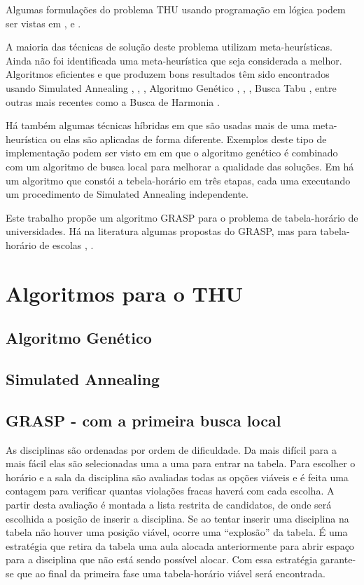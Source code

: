\documentclass[11pt]{article}
\begin{document}
Algumas formulações do problema THU usando programação em lógica podem ser vistas em \cite{Gueret95buildinguniversity}, \cite{Goltz99universitytimetabling} e \cite{springerlink:10.1007/s10479-012-1081-x}.

A maioria das técnicas de solução deste problema utilizam meta-heurísticas. Ainda não foi identificada uma meta-heurística que seja considerada a melhor.  Algoritmos eficientes e que produzem bons resultados têm sido encontrados usando Simulated Annealing \cite{3-phaseSA}, \cite{sa_hyper_heuristica}, \cite{Elmohamed98acomparison}, Algoritmo Genético \cite{Erben95agenetic}, \cite{suyanto}, \cite{Kanoh:2008:KGA:1460198.1460201}, Busca Tabu \cite{elloumi2008}, entre outras mais recentes como a Busca de Harmonia \cite{albetar_harmony}.

Há também algumas técnicas híbridas em que são usadas mais de uma meta-heurística ou elas são aplicadas de forma diferente. Exemplos deste tipo de implementação podem ser visto em \cite{massoodian2008} em que o algoritmo genético é combinado com um algoritmo de busca local para melhorar a qualidade das soluções. Em \cite{3-phaseSA} há um algoritmo que constói a tebela-horário em três etapas, cada uma executando um procedimento de Simulated Annealing independente.

Este trabalho propõe um algoritmo GRASP para o problema de tabela-horário de universidades. Há na literatura algumas propostas do GRASP, mas para tabela-horário de escolas \cite{Souza:2004}, \cite{Vieira_agrasp}.



\section{Algoritmos para o THU}

\subsection{Algoritmo Genético}

\subsection{Simulated Annealing}

\subsection{GRASP - com a primeira busca local}

As disciplinas são ordenadas por ordem de dificuldade. Da mais difícil para a mais fácil elas são selecionadas uma a uma para entrar na tabela. Para escolher o horário e a sala da disciplina são avaliadas todas as opções viáveis e é feita uma contagem para verificar quantas violações fracas haverá com cada escolha. A partir desta avaliação é montada a lista restrita de candidatos, de onde será escolhida a posição de inserir a disciplina. Se ao tentar inserir uma disciplina na tabela não houver uma posição viável, ocorre uma “explosão” da tabela. É uma estratégia que retira da tabela uma aula alocada anteriormente para abrir espaço para a disciplina que não está sendo possível alocar. Com essa estratégia garante-se que ao final da primeira fase uma tabela-horário viável será encontrada. 
\end{document}
